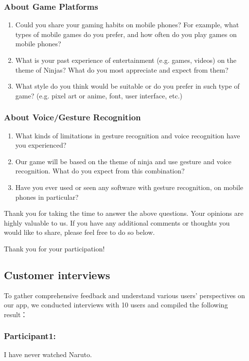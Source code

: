 \documentclass[UTF8,a4paper,12pt]{ctexart}
\numberwithin{equation}{section}
\begin{document}
\subsubsection{About Game Platforms}
\begin{enumerate}
    \item Could you share your gaming habits on mobile phones? For example, what types of mobile games do you prefer, and how often do you play games on mobile phones?
    \item What is your past experience of entertainment (e.g. games, videos) on the theme of Ninjas? What do you most appreciate and expect from them? 
    \item What style do you think would be suitable or do you prefer in such type of game? (e.g. pixel art or anime, font, user interface, etc.)
\end{enumerate}
\subsubsection{About Voice/Gesture Recognition}
\begin{enumerate}
    \item What kinds of limitations in gesture recognition and voice recognition have you experienced?
    \item Our game will be based on the theme of ninja and use gesture and voice recognition. What do you expect from this combination? 
    \item Have you ever used or seen any software with gesture recognition, on mobile phones in particular?
\end{enumerate}

Thank you for taking the time to answer the above questions. Your opinions are highly valuable to us. If you have any additional comments or thoughts you would like to share, please feel free to do so below.

Thank you for your participation!

\subsection{Customer interviews}
To gather comprehensive feedback and understand various users' perspectives on our app, we conducted interviews with 10 users and compiled the following result：

\subsubsection*{Participant1:} 
I have never watched Naruto.
\end{document}
